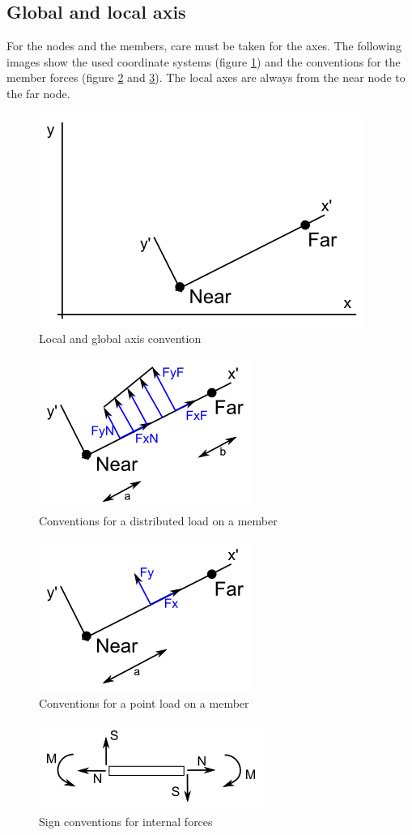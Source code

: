 \documentclass[a4paper]{article}
\begin{document}
	\subsection{Global and local axis}
		\begin{sloppypar}
		For the nodes and the members, care must be taken for the axes. 
		The following images show the used coordinate systems (figure \ref{fig:axis.png}) 
		and the conventions for the member forces (figure \ref{fig:dist.png} and \ref{fig:point.png}). 
		The local axes are always from the near node to the far node.
		\end{sloppypar}
		\begin{figure}[h]
			\includegraphics[width=0.50\linewidth]{axes.png}
			\caption{Local and global axis convention}
			\label{fig:axis.png}
		\end{figure}
		\begin{figure}[tb]
			\includegraphics[width=0.50\linewidth]{dist.png}
			\caption{Conventions for a distributed load on a member}
			\label{fig:dist.png}
		\end{figure}
		\begin{figure}[tb]
			\includegraphics[width=0.50\linewidth]{point.png}
			\caption{Conventions for a point load on a member}
			\label{fig:point.png}
		\end{figure}
		\begin{figure}[tb]
			\includegraphics[width=0.50\linewidth]{sign_conv.png}
			\caption{Sign conventions for internal forces}
			\label{fig:sign_conv.png}
		\end{figure}
\end{document}
